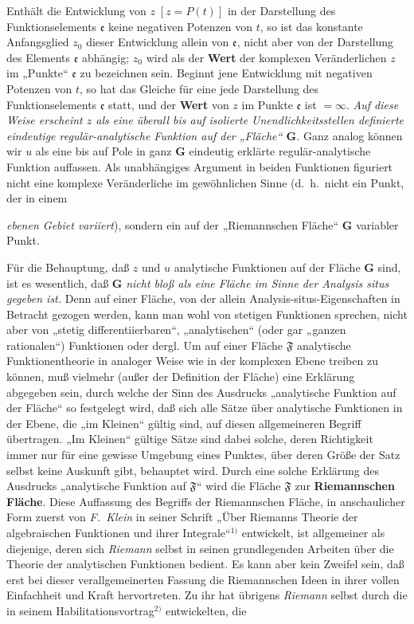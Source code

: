 \documentclass{article}
\begin{document}
Enthält die Entwicklung von $z\;[z = P(t)]$ in der Darstellung des Funktionselements $\mathfrak{e}$ keine negativen Potenzen von $t$, so ist das konstante Anfangsglied $z_0$ dieser Entwicklung allein von $\mathfrak{e}$, nicht aber von der Darstellung des Elements $\mathfrak{e}$ abhängig; $z_0$ wird als der \textbf{Wert} der komplexen Veränderlichen $z$ im „Punkte“ $\mathfrak{e}$ zu bezeichnen sein. Beginnt jene Entwicklung mit negativen Potenzen von $t$, so hat das Gleiche für eine jede Darstellung des Funktionselements $\mathfrak{e}$ statt, und der \textbf{Wert} von $z$ im Punkte $\mathfrak{e}$ ist $=\infty$. \emph{Auf diese Weise erscheint $z$ als eine überall bis auf isolierte Unendlichkeitsstellen definierte eindeutige regulär-analytische Funktion auf der „Fläche“ $\mathbf{G}$.} Ganz analog können wir $u$ als eine bis auf Pole in ganz $\mathbf{G}$ eindeutig erklärte regulär-analytische Funktion auffassen. Als unabhängiges Argument in beiden Funktionen figuriert nicht eine komplexe Veränderliche im gewöhnlichen Sinne (d.\ h.\ nicht ein Punkt, der in einem

\emph{ebenen Gebiet variiert}), sondern ein auf der „Riemannschen Fläche“ $\mathbf{G}$ variabler Punkt.

Für die Behauptung, daß $z$ und $u$ analytische Funktionen auf der Fläche $\mathbf{G}$ sind, ist es wesentlich, daß $\mathbf{G}$ \emph{nicht bloß als eine Fläche im Sinne der Analysis situs gegeben ist.} Denn auf einer Fläche, von der allein Analysis-situs-Eigenschaften in Betracht gezogen werden, kann man wohl von stetigen Funktionen sprechen, nicht aber von „stetig differentiierbaren“, „analytischen“ (oder gar „ganzen rationalen“) Funktionen oder dergl. Um auf einer Fläche $\mathfrak{F}$ analytische Funktionentheorie in analoger Weise wie in der komplexen Ebene treiben zu können, muß vielmehr (außer der Definition der Fläche) eine Erklärung abgegeben sein, durch welche der Sinn des Ausdrucks „analytische Funktion auf der Fläche“ so festgelegt wird, daß sich alle Sätze über analytische Funktionen in der Ebene, die „im Kleinen“ gültig sind, auf diesen allgemeineren Begriff übertragen. „Im Kleinen“ gültige Sätze sind dabei solche, deren Richtigkeit immer nur für eine gewisse Umgebung eines Punktes, über deren Größe der Satz selbst keine Auskunft gibt, behauptet wird. Durch eine solche Erklärung des Ausdrucks „analytische Funktion auf $\mathfrak{F}$“ wird die Fläche $\mathfrak{F}$ zur \textbf{Riemannschen Fläche}. Diese Auffassung des Begriffs der Riemannschen Fläche, in anschaulicher Form zuerst von \emph{F.~Klein} in seiner Schrift „Über Riemanns Theorie der algebraischen Funktionen und ihrer Integrale“${}^{1)}$ entwickelt, ist allgemeiner als diejenige, deren sich \emph{Riemann} selbst in seinen grundlegenden Arbeiten über die Theorie der analytischen Funktionen bedient. Es kann aber kein Zweifel sein, daß erst bei dieser verallgemeinerten Fassung die Riemannschen Ideen in ihrer vollen Einfachheit und Kraft hervortreten. Zu ihr hat übrigens \emph{Riemann} selbst durch die in seinem Habilitationsvortrag${}^{2)}$ entwickelten, die
\end{document}
